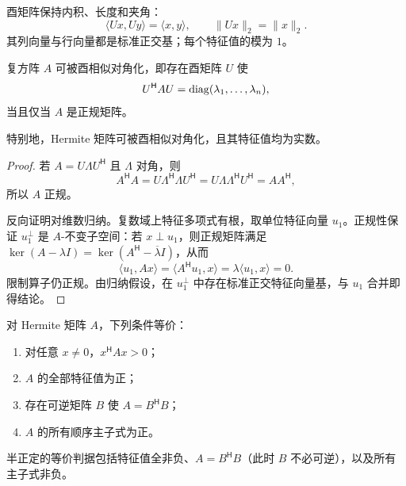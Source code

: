 酉矩阵保持内积、长度和夹角：
\[
\langle Ux,Uy\rangle=\langle x,y\rangle,
\qquad
\lVert Ux\rVert_2=\lVert x\rVert_2.
\]
其列向量与行向量都是标准正交基；每个特征值的模为 $1$。

\begin{theorem}[复谱定理]
复方阵 $A$ 可被酉相似对角化，即存在酉矩阵 $U$ 使
\[
U^{\mathsf H}AU=\operatorname{diag}(\lambda_1,\ldots,\lambda_n),
\]
当且仅当 $A$ 是正规矩阵。

特别地，Hermite 矩阵可被酉相似对角化，且其特征值均为实数。
\end{theorem}
\begin{proof}
若 $A=U\Lambda U^{\mathsf H}$ 且 $\Lambda$ 对角，则
\[
A^{\mathsf H}A
=U\Lambda^{\mathsf H}\Lambda U^{\mathsf H}
=U\Lambda\Lambda^{\mathsf H}U^{\mathsf H}
=AA^{\mathsf H},
\]
所以 $A$ 正规。

反向证明对维数归纳。复数域上特征多项式有根，取单位特征向量 $u_1$。正规性保证
$u_1^\perp$ 是 $A$-不变子空间：若 $x\perp u_1$，则正规矩阵满足
$\ker(A-\lambda I)=\ker(A^{\mathsf H}-\overline\lambda I)$，从而
\[
\langle u_1,Ax\rangle
=\langle A^{\mathsf H}u_1,x\rangle
=\lambda\langle u_1,x\rangle=0.
\]
限制算子仍正规。由归纳假设，在 $u_1^\perp$ 中存在标准正交特征向量基，与 $u_1$ 合并即得结论。
\end{proof}

\begin{theorem}
对 Hermite 矩阵 $A$，下列条件等价：
\begin{enumerate}
\item 对任意 $x\ne0$，$x^{\mathsf H}Ax>0$；
\item $A$ 的全部特征值为正；
\item 存在可逆矩阵 $B$ 使 $A=B^{\mathsf H}B$；
\item $A$ 的所有顺序主子式为正。
\end{enumerate}
半正定的等价判据包括特征值全非负、$A=B^{\mathsf H}B$（此时 $B$ 不必可逆），以及所有主子式非负。
\end{theorem}

